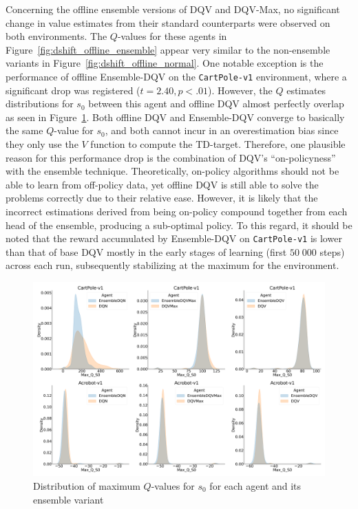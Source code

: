 Concerning the offline ensemble versions of DQV and DQV-Max, no
significant change in value estimates from their standard counterparts
were observed on both environments. The $Q$-values for these agents in
Figure~\ref{fig:dshift_offline_ensemble} appear very similar to the
non-ensemble variants in Figure~\ref{fig:dshift_offline_normal}. One
notable exception is the performance of offline Ensemble-DQV on the
\texttt{CartPole-v1} environment, where a significant drop was
registered ($t=2.40,p<.01$). However, the $Q$ estimates distributions
for $s_0$ between this agent and offline DQV almost perfectly
overlap as seen in Figure~\ref{fig:qv_dist}. Both offline
DQV and Ensemble-DQV converge to basically the same $Q$-value for
$s_0$, and both cannot incur in an overestimation bias since they only
use the $V$ function to compute the TD-target. Therefore, one
plausible reason for this performance drop is the combination of DQV's
``on-policyness'' with the ensemble technique. Theoretically,
on-policy algorithms should not be able to learn from off-policy data,
yet offline DQV is still able to solve the problems correctly due to
their relative ease. However, it is likely that the incorrect
estimations derived from being on-policy compound together from each
head of the ensemble, producing a sub-optimal policy. To this regard,
it should be noted that the reward accumulated by Ensemble-DQV on
\texttt{CartPole-v1} is lower than that of base DQV mostly in the
early stages of learning (first $50 \; 000$ steps) across each run,
subsequently stabilizing at the maximum for the environment.
\begin{figure}[h]
  \centering
  \includegraphics[width=.9\textwidth]{img/all_qv_dist.png}
  \caption{Distribution of maximum $Q$-values for $s_0$ for each agent
    and its ensemble variant}\label{fig:qv_dist}
\end{figure}


